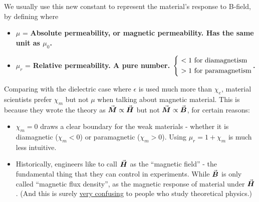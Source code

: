 \documentclass[class=article, crop=false, 12pt]{standalone}
\begin{document}
We usually use this new constant to represent the material's response to B-field,
by defining
where
\begin{itemize}
    \item $\mu$ = \bf{Absolute permeability}, or \bf{magnetic permeability}. Has the same unit as $\mu_0$.

    \item $\mu_r$ = \bf{Relative permeability}. A pure number. 
    $\left\{ \ \begin{aligned} 
        <1 &\text{ for diamagnetism}\\
        >1 &\text{ for paramagnetism}
     \end{aligned}\right.$.

\end{itemize}

Comparing with the dielectric case where $\epsilon$ is used much more than $\chi_e$,
material scientists prefer $\chi_m$ but not $\mu$ when talking about magnetic material.
This is because they wrote the theory as $\va*{M}\propto\va*{H}$ but not $\va*{M}\propto\va*{B}$,
for certain reasons:

\begin{itemize}
    \item $\chi_m=0$ draws a clear boundary for the weak materials - 
    whether it is diamagnetic ($\chi_m<0$) or paramagnetic ($\chi_m>0$). 
    Using $\mu_r =  1+\chi_m$ is much less intuitive.

    \item Historically, engineers like to call $\va*{H}$ as the ``magnetic field'' -
    the fundamental thing that they can control in experiments.
    While $\va*{B}$ is only called ``magnetic flux density'',
    as the magnetic response of material under $\va*{H}$.
    (And this is surely \href{https://www.e-magnetica.pl/doku.php/confusion_between_b_and_h}{very confusing}
    to people who study theoretical physics.)

    
\end{itemize}

\end{document}
